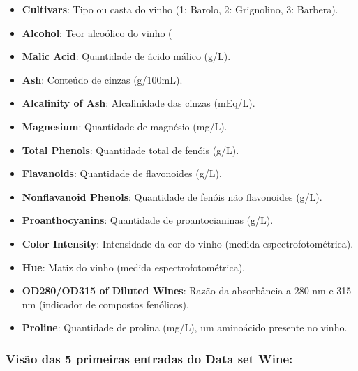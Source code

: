 \documentclass[
  letterpaper,
  DIV=11,
  numbers=noendperiod]{scrartcl}
\begin{document}
\begin{itemize}
  \item \textbf{Cultivars}: Tipo ou casta do vinho (1: Barolo, 2: Grignolino, 3: Barbera).
  \item \textbf{Alcohol}: Teor alcoólico do vinho (%
  \item \textbf{Malic Acid}: Quantidade de ácido málico (g/L).
  \item \textbf{Ash}: Conteúdo de cinzas (g/100mL).
  \item \textbf{Alcalinity of Ash}: Alcalinidade das cinzas (mEq/L).
  \item \textbf{Magnesium}: Quantidade de magnésio (mg/L).
  \item \textbf{Total Phenols}: Quantidade total de fenóis (g/L).
  \item \textbf{Flavanoids}: Quantidade de flavonoides (g/L).
  \item \textbf{Nonflavanoid Phenols}: Quantidade de fenóis não flavonoides (g/L).
  \item \textbf{Proanthocyanins}: Quantidade de proantocianinas (g/L).
  \item \textbf{Color Intensity}: Intensidade da cor do vinho (medida espectrofotométrica).
  \item \textbf{Hue}: Matiz do vinho (medida espectrofotométrica).
  \item \textbf{OD280/OD315 of Diluted Wines}: Razão da absorbância a 280 nm e 315 nm (indicador de compostos fenólicos).
  \item \textbf{Proline}: Quantidade de prolina (mg/L), um aminoácido presente no vinho.
\end{itemize}

\subsubsection{Visão das 5 primeiras entradas do Data set
Wine:}\label{visuxe3o-das-5-primeiras-entradas-do-data-set-wine}

\begingroup\fontsize{3.5}{5.5}\selectfont
\end{document}
